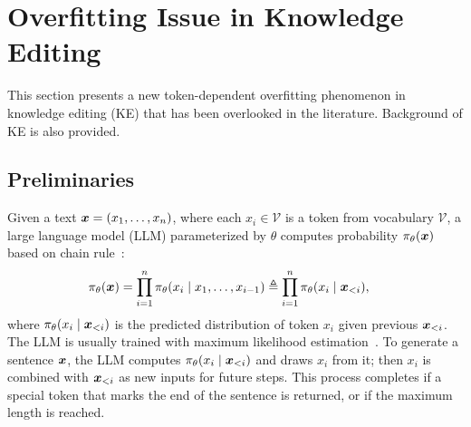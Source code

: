 \section{Overfitting Issue in Knowledge Editing}
\label{sec:problem}

This section presents a new token-dependent overfitting phenomenon in knowledge editing (KE) that has been overlooked in the literature.
Background of KE is also provided. 

\subsection{Preliminaries}





Given a text
$\boldsymbol{x} = (x_1, \dots, x_n)$, where each $x_i \in \mathcal V$ is a token from vocabulary $\mathcal V$, 
a large language model (LLM) parameterized by $\theta$ computes probability $\pi_\theta(\boldsymbol{x})$ based on chain rule~\citep{bengio2000neural}:
\begin{align}
    \pi_\theta(\boldsymbol{x}) 
    &= \prod_{i=1}^n \pi_\theta (x_i \mid {x_1, \dots, x_{i-1}}) 
    \triangleq \prod_{i=1}^n \pi_\theta (x_i \mid \boldsymbol{x}_{<i}), 
    \notag
\end{align}
where $\pi_\theta(x_i \mid \boldsymbol{x}_{<i} )$ is the predicted distribution of token $x_i$ given previous $\boldsymbol{x}_{<i}$. 
The LLM is usually trained with maximum likelihood estimation~\citep{hochreiter1997long,sutskever2014sequence,cho2014learning}. 
To generate a sentence $\boldsymbol{x}$, the LLM computes $\pi_\theta(x_i \mid \boldsymbol{x}_{<i})$ and draws $x_i$ from it; then $x_i$ is combined with $\boldsymbol{x}_{<i}$ as new inputs for future steps. 
This process completes if a special token that marks the end of the sentence is returned, or if the maximum length is reached.



